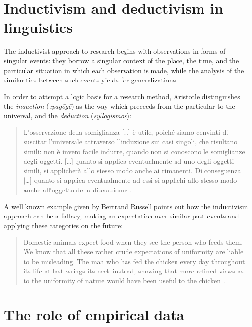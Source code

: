 \documentclass[a4paper,twoside,12pt,chapterprefix=false,bibliography=totocnumbered,listof=flat]{scrbook}
\begin{document}
\section{Inductivism and deductivism in
linguistics}\label{inductivism-and-deductivism-in-linguistics}

The inductivist approach to research begins with observations in forms
of singular events: they borrow a singular context of the place, the
time, and the particular situation in which each observation is made,
while the analysis of the similarities between such events yields for
generalizations.

In order to attempt a logic basis for a research method, Aristotle
distinguishes the \emph{induction} (\emph{epagōgē}) as the way which
preceeds from the particular to the universal, and the \emph{deduction}
(\emph{syllogismos}):

\begin{quote}
L'osservazione della somiglianza {[}\ldots{}{]} è utile, poiché siamo
convinti di suscitar l'universale attraverso l'induzione sui casi
singoli, che risultano simili: non è invero facile indurre, quando non
si conoscono le somiglianze degli oggetti. {[}\ldots{}{]} quanto si
applica eventualmente ad uno degli oggetti simili, si applicherà allo
stesso modo anche ai rimanenti. Di conseguenza {[}\ldots{}{]} quanto si
applica eventualmente ad essi si applichi allo stesso modo anche
all'oggetto della discussione\textasciitilde{}\citep[
1.18.108b]{aristoteleOrganon}.
\end{quote}

A well known example given by Bertrand Russell points out how the
inductivism approach can be a fallacy, making an expectation over
similar past events and applying these categories on the future:

\begin{quote}
Domestic animals expect food when they see the person who feeds them. We
know that all these rather crude expectations of uniformity are liable
to be misleading. The man who has fed the chicken every day throughout
its life at last wrings its neck instead, showing that more refined
views as to the uniformity of nature would have been useful to the
chicken \citep{russellProblems}.
\end{quote}

\section{The role of empirical data}\label{the-role-of-empirical-data}
\end{document}

